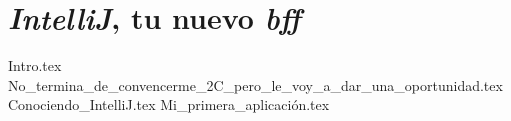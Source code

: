 \chapter{\textit{IntelliJ}, tu nuevo \textit{bff}}
  {Intro.tex}
  {No_termina_de_convencerme_2C_pero_le_voy_a_dar_una_oportunidad.tex}
  {Conociendo_IntelliJ.tex}
  {Mi_primera_aplicación.tex}
  \nocite{*}
  \printbibliography[keyword=intellij]